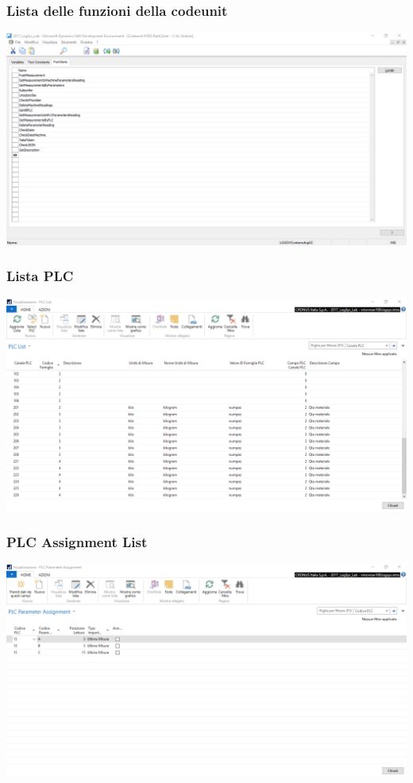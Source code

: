 \documentclass{beamer}
\begin{document}
\begin{frame}
\frametitle{Lista delle funzioni della codeunit}
\includegraphics[width=1\textwidth]{images/NAVFunctionList.png}
\end{frame}


\begin{frame}
\frametitle{Lista PLC}
\includegraphics[width=1\textwidth]{images/PLCList.png}
\end{frame}

\begin{frame}
\frametitle{PLC Assignment List}
\includegraphics[width=1\textwidth]{images/PLCAssignmentList.png}
\end{frame}
\end{document}
